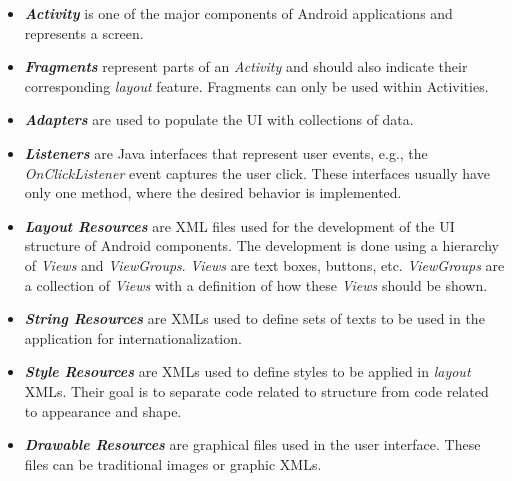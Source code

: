 \begin{itemize}

    \item \textbf{\textit{Activity}} is one of the major components of Android applications and represents a screen. 

    \item \textbf{\textit{Fragments}} represent parts of an \textit{Activity} and should also indicate their corresponding \textit{layout} feature. Fragments can only be used within Activities. 

    \item \textbf{\textit{Adapters}} are used to populate the \acs{UI} with collections of data.

    \item \textbf{\textit{Listeners}} are Java interfaces that represent user events, e.g., the \textit{OnClickListener} event captures the user click. These interfaces usually have only one method, where the desired behavior is implemented.

    \item \textbf{\textit{Layout Resources}} are XML files used for the development of the \acs{UI} structure of Android components. The development is done using a hierarchy of \textit {Views} and \textit {ViewGroups}. \textit{Views} are text boxes, buttons, etc. \textit {ViewGroups} are a collection of \textit{Views} with a definition of how these \textit {Views} should be shown.

    \item \textbf{\textit{String Resources}} are XMLs used to define sets of texts to be used in the application for internationalization.

    \item \textbf{\textit{Style Resources}} are XMLs used to define styles to be applied in \textit {layout} XMLs. Their goal is to separate code related to structure from code related to appearance and shape.

    \item \textbf{\textit{Drawable Resources}} are graphical files used in the user interface. These files can be traditional images or graphic XMLs. 

\end{itemize}
